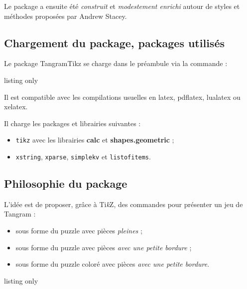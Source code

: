 \documentclass{article}
\providecommand\tikzlogo{Ti\textit{k}Z}
\let\TikZ\tikzlogo
\newcommand\Cle[1]{{\bfseries\sffamily\textlangle #1\textrangle}}
\begin{document}
\smallskip

Le package a ensuite été \textit{construit} et \textit{modestement enrichi} autour de styles et méthodes proposées par Andrew Stacey.

\subsection{Chargement du package, packages utilisés}

Le package \textsf{TangramTikz} se charge dans le préambule via la commande :

\begin{PresentationCode}{listing only}
\usepackage{TangramTikz}
\end{PresentationCode}

Il est compatible avec les compilations usuelles en \textsf{latex}, \textsf{pdflatex}, \textsf{lualatex} ou \textsf{xelatex}.

\medskip

Il charge les packages et librairies suivantes :

\begin{itemize}
	\item \texttt{tikz} avec les librairies \Cle{calc} et \Cle{shapes.geometric} ;
	\item \texttt{xstring}, \texttt{xparse}, \texttt{simplekv} et \texttt{listofitems}.
\end{itemize}

\subsection{\og Philosophie \fg{} du package}

L'idée est de proposer, grâce à \TikZ, des \textsf{commandes} pour présenter un jeu de Tangram :

\begin{itemize}
	\item sous forme du puzzle avec pièces \textit{pleines} ;
	\item sous forme du puzzle avec pièces \textit{avec une petite bordure} ;
	\item sous forme du puzzle coloré avec pièces \textit{avec une petite bordure}.
\end{itemize}

\begin{PresentationCode}{listing only}
\end{PresentationCode}
\end{document}
